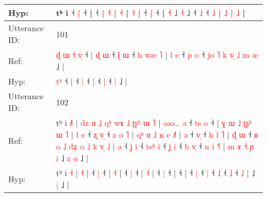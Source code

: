 \documentclass[10pt]{article}
\DeclareRobustCommand{\hl}[1]{{\textcolor{red}{#1}}}
\begin{document}
\begin{longtable}{ll}
 \\
Hyp: & \hl{}\hl{}\hl{}\hl{}\hl{}\hl{}\hl{}\hl{}\hl{}\hl{}\hl{}\hl{}\hl{}\hl{}\hl{}\hl{}\hl{}\hl{}\hl{}\hl{}\hl{}\hl{}\hl{}\hl{}\hl{}\hl{}\hl{}\hl{}\hl{}\hl{}\hl{}\hl{}\hl{}\hl{}\hl{}\hl{}\hl{}\hl{}\hl{}\hl{}\hl{}\hl{}\hl{}t\hl{}ʰ i ˧\hl{}\hl{} \hl{|} ˧ |\hl{}\hl{}\hl{}\hl{}\hl{}\hl{}\hl{}\hl{}\hl{}\hl{}\hl{}\hl{} ˧\hl{}\hl{}\hl{}\hl{} \hl{|} \hl{˧} \hl{|} \hl{˧} | \hl{˧} \hl{}\hl{|} ˧\hl{}\hl{} \hl{|} ˧\hl{} |\hl{}\hl{} \hl{}\hl{˧} ˩\hl{}\hl{}\hl{}\hl{}\hl{}\hl{}\hl{}\hl{} \hl{˧} ˩\hl{}\hl{}\hl{}\hl{}\hl{}\hl{} ˧\hl{}\hl{}\hl{} \hl{˩} ˧\hl{}\hl{}\hl{} \hl{}\hl{˩} \hl{|} \hl{˩} \hl{|} \hl{˩} |
 \\
\midrule
Utterance ID: & 101 \\
Ref: & \hl{ɖ}\hl{ }\hl{ɯ}\hl{ }\hl{˧}\hl{ }\hl{v}\hl{̩} ˧ |\hl{ }\hl{ɖ}\hl{ }\hl{ɯ} ˧\hl{ }\hl{ɭ} \hl{ɯ} ˧\hl{ }\hl{h}\hl{ }\hl{w}\hl{æ}\hl{ }\hl{˥} |\hl{ }\hl{l}\hl{ }\hl{e} ˧\hl{ }\hl{p} \hl{o} ˧\hl{ }\hl{j}\hl{o}\hl{ }\hl{˥}\hl{ }\hl{k}\hl{ }\hl{v}\hl{̩}\hl{ }\hl{˩}\hl{ }\hl{m} \hl{æ} ˩ |
 \\
Hyp: & \hl{}\hl{}\hl{}\hl{}\hl{}\hl{}\hl{t}\hl{ʰ} ˧ |\hl{}\hl{}\hl{}\hl{} ˧\hl{}\hl{} \hl{|} ˧\hl{}\hl{}\hl{}\hl{}\hl{}\hl{}\hl{} |\hl{}\hl{}\hl{}\hl{} ˧\hl{}\hl{} \hl{|} ˧\hl{}\hl{}\hl{}\hl{}\hl{}\hl{}\hl{}\hl{}\hl{}\hl{}\hl{}\hl{}\hl{}\hl{} \hl{|} ˩ |
 \\
\midrule
Utterance ID: & 102 \\
Ref: & tʰ i \hl{˩}\hl{˥} |\hl{ }\hl{d}\hl{z}\hl{ }\hl{ɑ}\hl{ }\hl{˩}\hl{ }\hl{q}\hl{ʰ}\hl{ }\hl{w}\hl{ɤ}\hl{ }\hl{˩}\hl{ }\hl{ʈ}\hl{ʂ}\hl{ʰ}\hl{ }\hl{ɯ} \hl{˥} |\hl{ }\hl{ə}\hl{ə}\hl{ə}\hl{…}\hl{ }\hl{ə} ˧\hl{ }\hl{t}\hl{s} \hl{o} ˧ |\hl{ }\hl{ɣ}\hl{ }\hl{ɯ}\hl{ }\hl{˩}\hl{ }\hl{ʈ}\hl{ʂ}\hl{ʰ}\hl{ }\hl{ɯ} \hl{˥} |\hl{ }\hl{l}\hl{ }\hl{e} ˧\hl{ }\hl{ʐ} \hl{v}\hl{̩} ˧\hl{ }\hl{z}\hl{ }\hl{o}\hl{ }\hl{˥} |\hl{ }\hl{q}\hl{ʰ}\hl{ }\hl{ɑ}\hl{ }\hl{˩}\hl{ }\hl{n}\hl{ }\hl{e} \hl{˩}\hl{˥} |\hl{ }\hl{ə} ˧ \hl{v}\hl{̩} ˧\hl{ }\hl{h}\hl{ }\hl{i}\hl{̃}\hl{ }\hl{˥} |\hl{ }\hl{ɖ}\hl{ }\hl{ɯ} ˧\hl{ }\hl{ʁ}\hl{ }\hl{o}\hl{ }\hl{˩}\hl{ }\hl{d}\hl{ʑ}\hl{ }\hl{o}\hl{ }\hl{˩}\hl{ }\hl{k}\hl{ }\hl{v}\hl{̩}\hl{ }\hl{˩} |\hl{ }\hl{ə} ˧\hl{ }\hl{ʝ} \hl{i} ˧\hl{ }\hl{t}\hl{s}\hl{ʰ} \hl{i} ˧\hl{ }\hl{ʝ} \hl{i} ˧\hl{ }\hl{b} \hl{v}\hl{̩} ˧\hl{ }\hl{n}\hl{ }\hl{i} \hl{˧}\hl{˥} |\hl{ }\hl{m}\hl{ }\hl{ɤ}\hl{ }\hl{˧}\hl{ }\hl{ɲ}\hl{ }\hl{i} ˩\hl{ }\hl{z} \hl{o} ˩ |
 \\
Hyp: & tʰ i \hl{}\hl{˧} |\hl{}\hl{}\hl{}\hl{}\hl{}\hl{}\hl{}\hl{}\hl{}\hl{}\hl{}\hl{}\hl{}\hl{}\hl{}\hl{}\hl{}\hl{}\hl{}\hl{}\hl{} \hl{˧} |\hl{}\hl{}\hl{}\hl{}\hl{}\hl{}\hl{} ˧\hl{}\hl{}\hl{} \hl{|} ˧ |\hl{}\hl{}\hl{}\hl{}\hl{}\hl{}\hl{}\hl{}\hl{}\hl{}\hl{}\hl{} \hl{˧} |\hl{}\hl{}\hl{}\hl{} ˧\hl{}\hl{} \hl{}\hl{|} ˧\hl{}\hl{}\hl{}\hl{}\hl{}\hl{} |\hl{}\hl{}\hl{}\hl{}\hl{}\hl{}\hl{}\hl{}\hl{}\hl{}\hl{} \hl{}\hl{˧} |\hl{}\hl{} ˧ \hl{}\hl{|} ˧\hl{}\hl{}\hl{}\hl{}\hl{}\hl{}\hl{} |\hl{}\hl{}\hl{}\hl{} ˧\hl{}\hl{}\hl{}\hl{}\hl{}\hl{}\hl{}\hl{}\hl{}\hl{}\hl{}\hl{}\hl{}\hl{}\hl{}\hl{}\hl{}\hl{}\hl{}\hl{} |\hl{}\hl{} ˧\hl{}\hl{} \hl{|} ˧\hl{}\hl{}\hl{}\hl{} \hl{|} ˧\hl{}\hl{} \hl{˩} ˧\hl{}\hl{} \hl{}\hl{˩} ˧\hl{}\hl{}\hl{}\hl{} \hl{}\hl{˩} |\hl{}\hl{}\hl{}\hl{}\hl{}\hl{}\hl{}\hl{}\hl{}\hl{} ˩\hl{}\hl{} \hl{|} ˩ |

\end{longtable}
\end{document}
